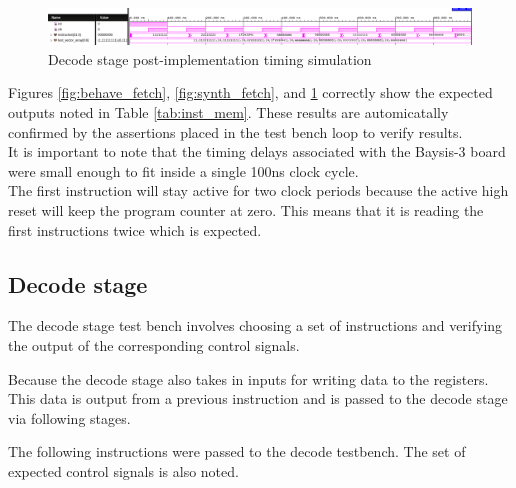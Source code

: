 \documentclass[CMPE]{../KGCOEReport}
\begin{document}
    \begin{figure}[h!]
        \centering
        \includegraphics[width=\textwidth]{img/impl_fetch}
        \caption{Decode stage post-implementation timing simulation}
        \label{fig:impl_fetch}
    \end{figure}

    Figures \ref{fig:behave_fetch}, \ref{fig:synth_fetch}, and
    \ref{fig:impl_fetch} correctly show the expected outputs noted
    in Table \ref{tab:inst_mem}. These results are automicatally confirmed
    by the assertions placed in the test bench loop to verify results.
    \\
    It is important to note that the timing delays associated with the Baysis-3
    board were small enough to fit inside a single 100ns clock cycle.
    \\
    The first instruction will stay active for two clock periods because the
    active high reset will keep the program counter at zero. This means
    that it is reading the first instructions twice which is expected.
    
    \pagebreak
    \subsection*{Decode stage}

    The decode stage test bench involves choosing a set of instructions
    and verifying the output of the corresponding control signals.
    
    Because the decode stage also takes in inputs for writing data
    to the registers. This data is output from a previous instruction
    and is passed to the decode stage via following stages.
    
    The following instructions were passed to the decode testbench. The
    set of expected control signals is also noted.
    
\end{document}

